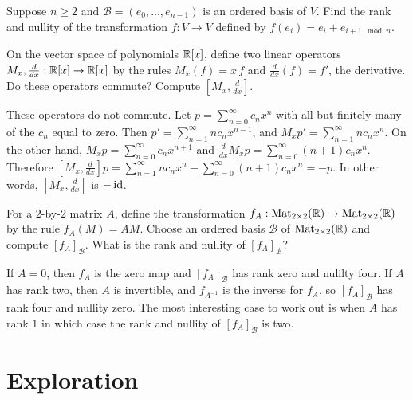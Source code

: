 \documentclass{homework}
\begin{document}
\begin{problem}
  Suppose $n \geq 2$ and $\mathcal{B} = (e_0,\ldots,e_{n-1})$ is an ordered basis of $V$.  Find the rank and nullity of the transformation $f : V \to V$ defined by $f(e_i) = e_i + e_{i+1 \mod n}$.
\end{problem}

\begin{problem}\label{derivative-multiplication-commute}On the vector space of polynomials $\mathbb{R}[x]$, define two linear operators $M_x, \frac{d}{dx} : \mathbb{R}[x] \to \mathbb{R}[x]$ by the rules $M_x(f) = x \, f$ and $\frac{d}{dx}(f) = f'$, the derivative.  Do these operators commute?  Compute $[M_x,\frac{d}{dx}]$.
\end{problem}

\begin{solution}
  These operators do not commute.  Let $p = \sum_{n=0}^\infty c_n x^n$
  with all but finitely many of the $c_n$ equal to zero.  Then
  $p' = \sum_{n=1}^\infty n c_n x^{n-1}$, and $M_x p' = \sum_{n=1}^\infty n c_n x^{n}$.  On the other hand, $M_x p = \sum_{n=0}^\infty c_n x^{n+1}$ and $\frac{d}{dx} M_x p = \sum_{n=0}^\infty (n+1) c_n x^n$. Therefore $[M_x,\frac{d}{dx}] p = \sum_{n=1}^\infty n c_n x^{n} - \sum_{n=0}^\infty (n+1) c_n x^n = -p$.  In other words, $[M_x,\frac{d}{dx}]$ is $-\operatorname{id}$.
\end{solution}

\begin{problem}
  For a $2$-by-$2$ matrix $A$, define the transformation
  $f_A : \operatorname{Mat}_{2\times 2}(\mathbb{R}) \to \operatorname{Mat}_{2\times 2}(\mathbb{R})$ by the rule
  $f_A(M) = AM$.  Choose an ordered basis
  $\mathcal{B}$ of $\operatorname{Mat}_{2\times 2}(\mathbb{R})$ and compute
  $[f_A]_{\mathcal{B}}$.  What is the rank and nullity of $[f_A]_{\mathcal{B}}$?
\end{problem}

\begin{solution}
  If $A = 0$, then $f_A$ is the zero map and $[f_A]_{\mathcal{B}}$ has
  rank zero and nulilty four.  If $A$ has rank two, then $A$ is
  invertible, and $f_{A^{-1}}$ is the inverse for $f_A$, so
  $[f_A]_{\mathcal{B}}$ has rank four and nullity zero.  The most
  interesting case to work out is when $A$ has rank $1$ in which case
  the rank and nullity of $[f_A]_{\mathcal{B}}$ is two.
\end{solution}

\section{Exploration}
\end{document}

